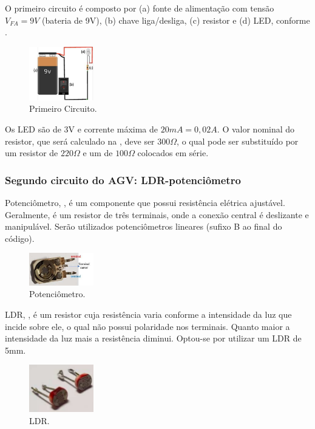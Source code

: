 \documentclass{textolivre-html}
\begin{document}
O primeiro circuito é composto por (a) fonte de alimentação com tensão $V_{FA} = 9V$
(bateria de 9V), (b) chave liga/desliga, (c) resistor e (d) LED,
conforme .

\begin{figure}[htbp]
\centering
\includegraphics[width=0.25\textwidth]{figure-13.pdf}
\caption{Primeiro Circuito.}
\label{fig07}
\end{figure}

Os LED são de 3V e corrente máxima de $20mA = 0,02A$. O valor nominal do
resistor, que será calculado na , deve ser $300\Omega$, o qual pode ser
substituído por um resistor de $220\Omega$ e um de $100\Omega$ colocados em série.


\subsubsection{Segundo circuito do AGV: LDR-potenciômetro}\label{sec-seg-circ}
Potenciômetro, , é um componente que possui resistência elétrica
ajustável. Geralmente, é um resistor de três terminais, onde a conexão central
é deslizante e manipulável. Serão utilizados potenciômetros lineares (sufixo B
ao final do código).

\begin{figure}[htbp]
\centering
\includegraphics[width=0.25\textwidth]{figure-14.pdf}
\caption{Potenciômetro.}
\label{fig08}
\end{figure}

LDR, , é um resistor cuja resistência varia conforme a intensidade da
luz que incide sobre ele, o qual não possui polaridade nos terminais. Quanto
maior a intensidade da luz mais a resistência diminui. Optou-se por utilizar um
LDR de 5mm.

\begin{figure}[htbp]
\centering
\includegraphics[width=0.25\textwidth]{figure-15.pdf}
\caption{LDR.}
\label{fig09}
\end{figure}
\end{document}
